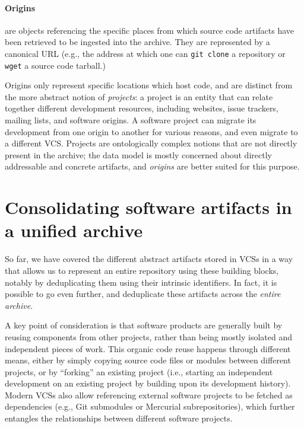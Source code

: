 \begin{figure}\centering
{}
\end{figure}
\paragraph{\textbf{Origins}} are objects referencing the specific places from
which source code artifacts have been retrieved to be ingested into the
archive.  They are represented by a canonical URL (e.g., the address at which
one can \texttt{git clone} a repository or \texttt{wget} a source code
tarball.)

Origins only represent specific locations which host code, and are distinct
from the more abstract notion of \emph{projects}: a project is an entity that
can relate together different development resources, including websites, issue
trackers, mailing lists, and software origins. A software project can migrate
its development from one origin to another for various reasons, and even
migrate to a different \gls{VCS}. Projects are ontologically complex notions
that are not directly present in the archive; the data model is mostly
concerned about directly addressable and concrete artifacts, and \emph{origins}
are better suited for this purpose.

\section{Consolidating software artifacts in a unified archive}

So far, we have covered the different abstract artifacts stored in \glspl{VCS}
in a way that allows us to represent an entire repository using these building
blocks, notably by deduplicating them using their intrinsic identifiers.
In fact, it is possible to go even further, and deduplicate these artifacts
across the \emph{entire archive}.

A key point of consideration is that software products are generally built by
reusing components from other projects, rather than being mostly isolated and
independent pieces of work. This organic code reuse happens through different
means, either by simply copying source code files or modules between different
projects, or by ``forking'' an existing project (i.e., starting an independent
development on an existing project by building upon its development history).
Modern \glspl{VCS} also allow referencing external software projects to be
fetched as dependencies (e.g., Git submodules or Mercurial subrepositories),
which further entangles the relationships between different software projects.

